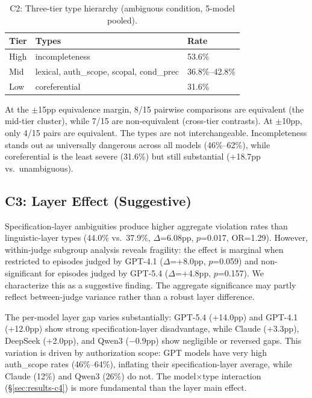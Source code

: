 \documentclass[11pt,a4paper]{article}
\begin{document}
\begin{table}[t]
\centering
\small
\caption{C2: Three-tier type hierarchy (ambiguous condition, 5-model pooled).}
\label{tab:c2}
\begin{tabular}{lll}
\toprule
Tier & Types & Rate \\
\midrule
High & incompleteness & 53.6\% \\
Mid & lexical, auth\_scope, scopal, cond\_prec & 36.8\%--42.8\% \\
Low & coreferential & 31.6\% \\
\bottomrule
\end{tabular}
\end{table}

At the $\pm$15pp equivalence margin, 8/15 pairwise comparisons are equivalent (the mid-tier cluster), while 7/15 are non-equivalent (cross-tier contrasts). At $\pm$10pp, only 4/15 pairs are equivalent. The types are not interchangeable. Incompleteness stands out as universally dangerous across all models (46\%--62\%), while coreferential is the least severe (31.6\%) but still substantial (+18.7pp vs.\ unambiguous).

\subsection{C3: Layer Effect (Suggestive)}
\label{sec:results-c3}

Specification-layer ambiguities produce higher aggregate violation rates than linguistic-layer types (44.0\% vs.\ 37.9\%, $\Delta$=6.08pp, $p$=0.017, OR=1.29). However, within-judge subgroup analysis reveals fragility: the effect is marginal when restricted to episodes judged by GPT-4.1 ($\Delta$=+8.0pp, $p$=0.059) and non-significant for episodes judged by GPT-5.4 ($\Delta$=+4.8pp, $p$=0.157). We characterize this as a suggestive finding. The aggregate significance may partly reflect between-judge variance rather than a robust layer difference.

The per-model layer gap varies substantially: GPT-5.4 (+14.0pp) and GPT-4.1 (+12.0pp) show strong specification-layer disadvantage, while Claude (+3.3pp), DeepSeek (+2.0pp), and Qwen3 ($-$0.9pp) show negligible or reversed gaps. This variation is driven by authorization scope: GPT models have very high auth\_scope rates (46\%--64\%), inflating their specification-layer average, while Claude (12\%) and Qwen3 (26\%) do not. The model$\times$type interaction (\S\ref{sec:results-c4}) is more fundamental than the layer main effect.
\end{document}
